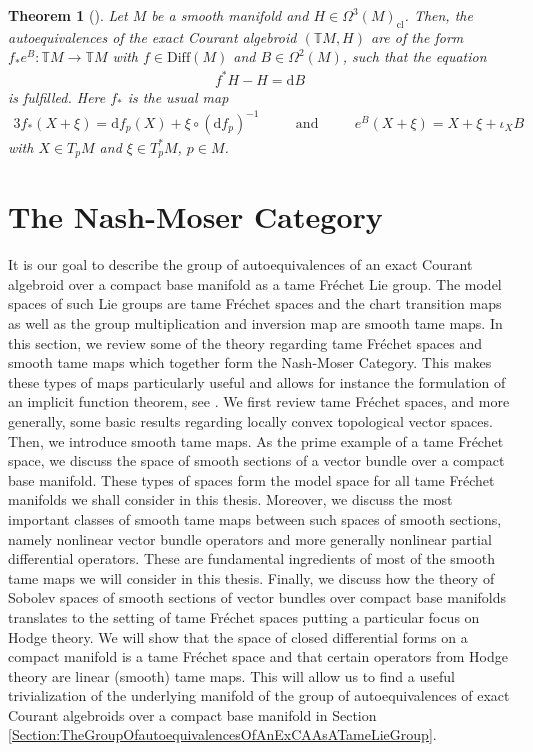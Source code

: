\documentclass[12pt,a4paper]{article}
\theoremstyle{plain}
\newtheorem{theorem}{Theorem}[subsection]
\theoremstyle{definition}
\newcommand{\Forms}[1]{\Omega^{#1}(M)}
\newcommand{\ClForms}[1]{\Forms{#1}_{\mathrm{cl}}}
\newcommand{\Diff}{\mathrm{Diff}(M)}
\renewcommand{\d}{\mathrm{d}}
\begin{document}
\begin{theorem}[{\cite[Proposition 2.2]{gualtieriAnn}}]
\label{AuteqCharacterizationTheorem}
Let $M$ be a smooth manifold and $H\in \ClForms{3}$. Then, the autoequivalences of the exact Courant algebroid $(\mathbb{T}M, H)$ are of the form $f_* e^B:\mathbb{T}M\to \mathbb{T}M$ with $f\in \Diff$ and $B\in \Forms{2}$, such that the equation
\begin{align*}
    f^*H-H=\d B
\end{align*}
is fulfilled. 
Here $f_*$ is the usual map
\begin{alignat*}{3}
    f_*(X+\xi)=\d f_p(X)+\xi\circ (\d f_p)^{-1}\quad && \text{and} &&\quad e^B(X+\xi)=X+\xi+\iota_XB
\end{alignat*}
with $X\in T_pM$ and $\xi\in T_p^*M$, $p\in M$. 
\end{theorem}








\section{The Nash-Moser Category}
\label{Section:Nash-Moser Category}

It is our goal to describe the group of autoequivalences of an exact Courant algebroid over a compact base manifold as a tame Fréchet Lie group. The model spaces of such Lie groups are tame Fréchet spaces and the chart transition maps as well as the group multiplication and inversion map are smooth tame maps. In this section, we review some of the theory regarding tame Fréchet spaces and smooth tame maps which together form the Nash-Moser Category. This makes these types of maps particularly useful and allows for instance the formulation of an implicit function theorem, see \cite{hamilton}.
We first review tame Fréchet spaces, and more generally, some basic results regarding locally convex topological vector spaces. Then, we introduce smooth tame maps. As the prime example of a tame Fréchet space, we discuss the space of smooth sections of a vector bundle over a compact base manifold. These types of spaces form the model space for all tame Fréchet manifolds we shall consider in this thesis. Moreover, we discuss the most important classes of smooth tame maps between such spaces of smooth sections, namely nonlinear vector bundle operators and more generally nonlinear partial differential operators. These are fundamental ingredients of most of the smooth tame maps we will consider in this thesis. Finally, we discuss how the theory of Sobolev spaces of smooth sections of vector bundles over compact base manifolds translates to the setting of tame Fréchet spaces putting a particular focus on Hodge theory. We will show that the space of closed differential forms on a compact manifold is a tame Fréchet space and that certain operators from Hodge theory are linear (smooth) tame maps. This will allow us to find a useful trivialization of the underlying manifold of the group of autoequivalences of exact Courant algebroids over a compact base manifold in Section \ref{Section:TheGroupOfautoequivalencesOfAnExCAAsATameLieGroup}.
\end{document}
